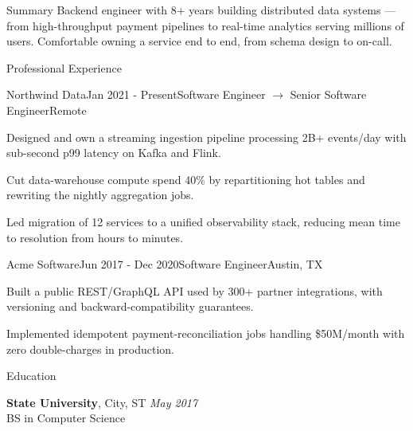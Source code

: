 \documentclass{resume}
\begin{document}
\begin{rSection}{Summary}
Backend engineer with 8+ years building distributed data systems --- from high-throughput payment pipelines to real-time analytics serving millions of users. Comfortable owning a service end to end, from schema design to on-call.
\end{rSection}

\begin{rSection}{Professional Experience}

\begin{rSubsection}{Northwind Data}{Jan 2021 - Present}{Software Engineer $\rightarrow$ Senior Software Engineer}{Remote}
    \item Designed and own a streaming ingestion pipeline processing 2B+ events/day with sub-second p99 latency on Kafka and Flink.
    \item Cut data-warehouse compute spend 40\% by repartitioning hot tables and rewriting the nightly aggregation jobs.
    \item Led migration of 12 services to a unified observability stack, reducing mean time to resolution from hours to minutes.
\end{rSubsection}

\begin{rSubsection}{Acme Software}{Jun 2017 - Dec 2020}{Software Engineer}{Austin, TX}
    \item Built a public REST/GraphQL API used by 300+ partner integrations, with versioning and backward-compatibility guarantees.
    \item Implemented idempotent payment-reconciliation jobs handling \$50M/month with zero double-charges in production.
\end{rSubsection}

\end{rSection}

\begin{rSection}{Education}

{\bf State University}, City, ST \hfill {\em May 2017} \\
BS in Computer Science

\end{rSection}
\end{document}
